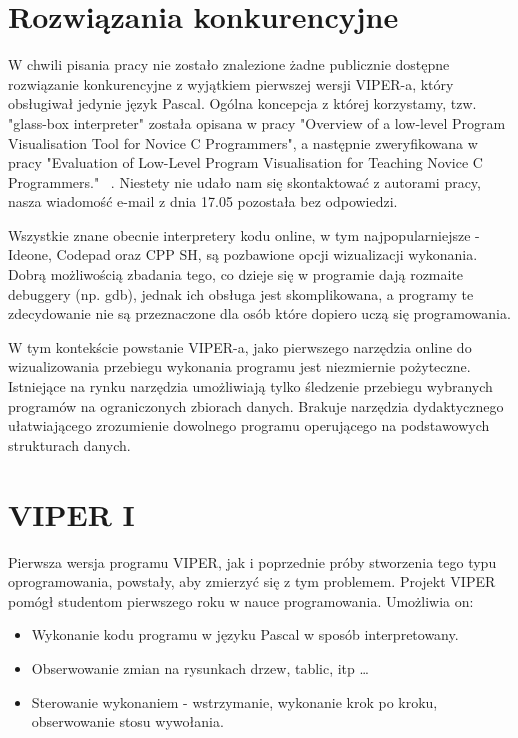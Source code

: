 \documentclass[a4paper,twoside,openright,11pt]{report}
\begin{document}
  \section{Rozwiązania konkurencyjne}
\par W chwili pisania pracy nie zostało znalezione żadne publicznie dostępne rozwiązanie konkurencyjne z wyjątkiem pierwszej wersji VIPER-a, który obsługiwał jedynie język Pascal. Ogólna koncepcja z której korzystamy, tzw. "glass-box interpreter" została opisana w pracy "Overview of a low-level Program Visualisation Tool for Novice C Programmers"\cite{overview-vistool}, a następnie zweryfikowana w pracy "Evaluation of Low-Level Program Visualisation for Teaching Novice C Programmers." ~\cite{evaluation-vistool}. Niestety nie udało nam się skontaktować z autorami pracy, nasza wiadomość e-mail z dnia 17.05 pozostała bez odpowiedzi.
\par Wszystkie znane obecnie interpretery kodu online, w tym najpopularniejsze - Ideone, Codepad oraz CPP SH, są pozbawione opcji wizualizacji wykonania. Dobrą możliwością zbadania tego, co dzieje się w programie dają rozmaite debuggery (np. gdb), jednak ich obsługa jest skomplikowana, a programy te zdecydowanie nie są przeznaczone dla osób które dopiero uczą się programowania.
\par W tym kontekście powstanie VIPER-a, jako pierwszego narzędzia online do wizualizowania przebiegu wykonania programu jest niezmiernie pożyteczne. Istniejące na rynku narzędzia umożliwiają tylko śledzenie przebiegu wybranych programów na ograniczonych zbiorach danych. Brakuje narzędzia dydaktycznego ułatwiającego zrozumienie dowolnego programu operującego na podstawowych strukturach danych. 

  \section{VIPER I}
\par Pierwsza wersja programu VIPER, jak i poprzednie próby stworzenia tego typu oprogramowania, powstały, aby zmierzyć się z tym problemem. Projekt VIPER pomógł studentom pierwszego roku w nauce programowania. Umożliwia on:
\begin{itemize}

  \item Wykonanie kodu programu w języku Pascal w sposób interpretowany.
  \item Obserwowanie zmian na rysunkach drzew, tablic, itp \ldots
  \item Sterowanie wykonaniem - wstrzymanie, wykonanie krok po kroku, obserwowanie stosu wywołania.

\end{itemize}
 
\end{document}
